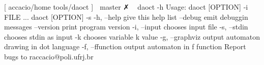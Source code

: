 [ accacio/home tools/daoct ]   master ✗ ~ daoct -h 
Usage: daoct [OPTION] -i FILE ... 
       daoct [OPTION] -s 
  -h, --help             give this help list 
      --debug            emit debuggin messages 
      --version          print program version 
  -i, --input            chooses input file 
  -s, --stdin            chooses stdin as input 
  -k                     chooses variable k value 
  -g, --graphviz         output automaton drawing in dot language 
  -f, --ffunction        output automaton in f function 
Report bugs to raccacio@poli.ufrj.br 


